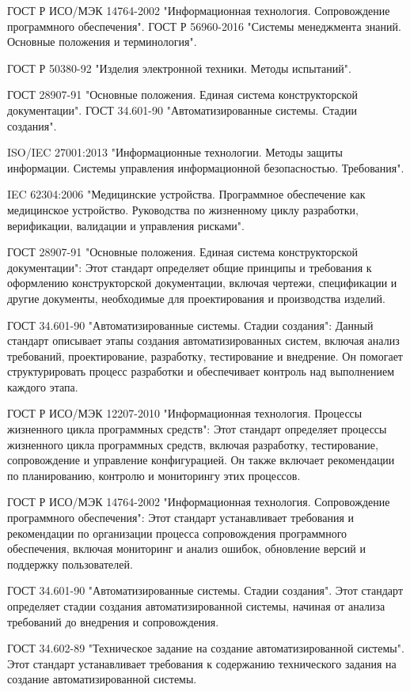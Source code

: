 ГОСТ Р ИСО/МЭК 14764-2002 "Информационная технология. Сопровождение программного обеспечения".
ГОСТ Р 56960-2016 "Системы менеджмента знаний. Основные положения и терминология".

ГОСТ Р 50380-92 "Изделия электронной техники. Методы испытаний".

ГОСТ 28907-91 "Основные положения. Единая система конструкторской документации".
ГОСТ 34.601-90 "Автоматизированные системы. Стадии создания".

ISO/IEC 27001:2013 "Информационные технологии. Методы защиты информации. Системы управления информационной безопасностью. Требования".

IEC 62304:2006 "Медицинские устройства. Программное обеспечение как медицинское устройство. Руководства по жизненному циклу разработки, верификации, валидации и управления рисками".

ГОСТ 28907-91 "Основные положения. Единая система конструкторской документации": Этот стандарт определяет общие принципы и требования к оформлению конструкторской документации, включая чертежи, спецификации и другие документы, необходимые для проектирования и производства изделий.

ГОСТ 34.601-90 "Автоматизированные системы. Стадии создания": Данный стандарт описывает этапы создания автоматизированных систем, включая анализ требований, проектирование, разработку, тестирование и внедрение. Он помогает структурировать процесс разработки и обеспечивает контроль над выполнением каждого этапа.

ГОСТ Р ИСО/МЭК 12207-2010 "Информационная технология. Процессы жизненного цикла программных средств": Этот стандарт определяет процессы жизненного цикла программных средств, включая разработку, тестирование, сопровождение и управление конфигурацией. Он также включает рекомендации по планированию, контролю и мониторингу этих процессов.

ГОСТ Р ИСО/МЭК 14764-2002 "Информационная технология. Сопровождение программного обеспечения": Этот стандарт устанавливает требования и рекомендации по организации процесса сопровождения программного обеспечения, включая мониторинг и анализ ошибок, обновление версий и поддержку пользователей.



ГОСТ 34.601-90 "Автоматизированные системы. Стадии создания". Этот стандарт определяет стадии создания автоматизированной системы, начиная от анализа требований до внедрения и сопровождения.

ГОСТ 34.602-89 "Техническое задание на создание автоматизированной системы". Этот стандарт устанавливает требования к содержанию технического задания на создание автоматизированной системы.

